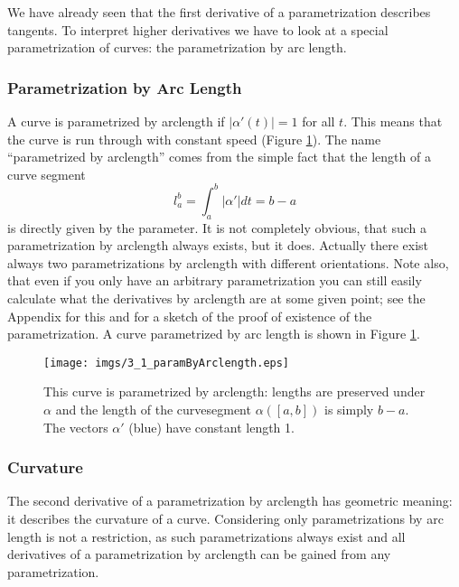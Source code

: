 
We have already seen that the first derivative of a parametrization describes tangents. To interpret higher derivatives we have to look at a special parametrization of curves: the parametrization by arc length.

\subsubsection{Parametrization by Arc Length}

A curve is parametrized by arclength if $|\alpha'(t)|=1$ for all $t$. This means that the curve is run through with constant speed (Figure \ref{fig::3_1_paramByArclength}). The name ``parametrized by arclength'' comes from the simple fact that the length of a curve segment 
\[l_a^b = \int_a^b |\alpha'| dt = b-a\]
is directly given by the parameter. It is not completely obvious, that such a parametrization by arclength always exists, but it does. Actually there exist always two parametrizations by arclength with different orientations. Note also, that even if you only have an arbitrary parametrization you can still easily calculate what the derivatives by arclength are at some given point; see the Appendix for this and for a sketch of the proof of existence of the parametrization. A curve parametrized by arc length is shown in Figure \ref{fig::3_1_paramByArclength}.

\begin{figure}[h]
\begin{center}
\texttt{[image: imgs/3\_1\_paramByArclength.eps]}
\end{center}
\caption{This curve is parametrized by arclength: lengths are preserved under $\alpha$ and the length of the curvesegment $\alpha([a,b])$ is simply $b-a$. The vectors $\alpha'$ (blue) have constant length 1.}
\label{fig::3_1_paramByArclength}
\end{figure}

\subsubsection{Curvature}
The second derivative of a parametrization by arclength has geometric meaning: it describes the curvature of a curve. Considering only parametrizations by arc length is not a restriction, as such parametrizations always exist and all derivatives of a parametrization by arclength can be gained from any parametrization.
	

